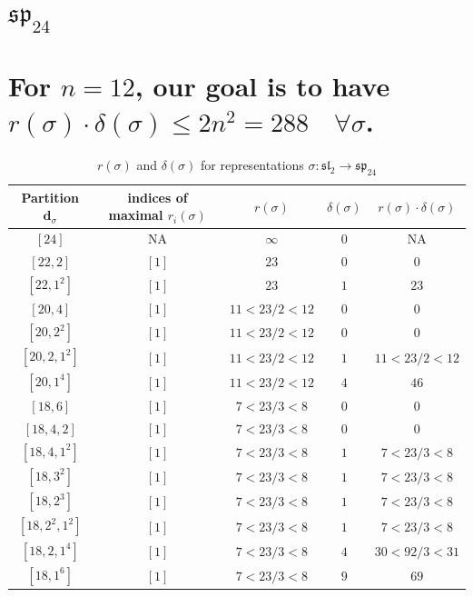\documentclass{article}%
\begin{document}
%
\section{$\mathfrak{sp}_{24}$}%
\section*{For $n=12$, our goal is to have $r(\sigma) \cdot \delta(\sigma) \leq 2n^2 = 288 \quad \forall \sigma$.}%

%
\linebreak%

    \begin{center}
    \label{table:sp_24}
    \begin{longtable}{||c|c|c|c|c||}
    \caption{$r(\sigma)$ and $\delta(\sigma)$ for representations $\sigma: \mathfrak{sl}_2 \to \mathfrak{sp}_{24}$}
    \hline
    Partition $\textbf{d}_\sigma$
    &indices of maximal $r_i(\sigma)$
    &$r(\sigma)$
    &$\delta(\sigma)$
    &$r(\sigma) \cdot \delta(\sigma)$
    \\ [0.3ex] \hline\endhead
    $[24]$ & NA & $\infty$ & $0$ & NA \\ \hline 
$[22, 2]$ & $[1]$ & $23$ & $0$ & $0$ \\ \hline 
$[22, 1^{2}]$ & $[1]$ & $23$ & $1$ & $23$ \\ \hline 
$[20, 4]$ & $[1]$ & $11 < 23/2 < 12$ & $0$ & $0$ \\ \hline 
$[20, 2^{2}]$ & $[1]$ & $11 < 23/2 < 12$ & $0$ & $0$ \\ \hline 
$[20, 2, 1^{2}]$ & $[1]$ & $11 < 23/2 < 12$ & $1$ & $11 < 23/2 < 12$ \\ \hline 
$[20, 1^{4}]$ & $[1]$ & $11 < 23/2 < 12$ & $4$ & $46$ \\ \hline 
$[18, 6]$ & $[1]$ & $7 < 23/3 < 8$ & $0$ & $0$ \\ \hline 
$[18, 4, 2]$ & $[1]$ & $7 < 23/3 < 8$ & $0$ & $0$ \\ \hline 
$[18, 4, 1^{2}]$ & $[1]$ & $7 < 23/3 < 8$ & $1$ & $7 < 23/3 < 8$ \\ \hline 
$[18, 3^{2}]$ & $[1]$ & $7 < 23/3 < 8$ & $1$ & $7 < 23/3 < 8$ \\ \hline 
$[18, 2^{3}]$ & $[1]$ & $7 < 23/3 < 8$ & $1$ & $7 < 23/3 < 8$ \\ \hline 
$[18, 2^{2}, 1^{2}]$ & $[1]$ & $7 < 23/3 < 8$ & $1$ & $7 < 23/3 < 8$ \\ \hline 
$[18, 2, 1^{4}]$ & $[1]$ & $7 < 23/3 < 8$ & $4$ & $30 < 92/3 < 31$ \\ \hline 
$[18, 1^{6}]$ & $[1]$ & $7 < 23/3 < 8$ & $9$ & $69$ \\ \hline 

\end{longtable}
\end{center}
\end{document}
